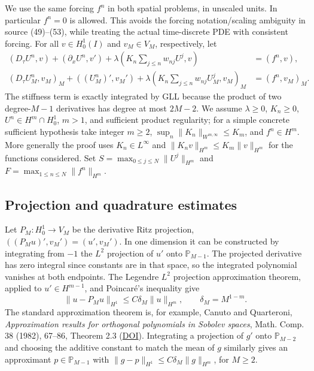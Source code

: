 \documentclass[11pt,a4paper]{amsart}
\theoremstyle{remark}
\theoremstyle{plain}
\theoremstyle{remark}
\numberwithin{equation}{section}
\begin{document}
We use the same forcing $f^n$ in both spatial problems, in unscaled units. In particular $f^n=0$ is allowed. This avoids the forcing notation/scaling ambiguity in source (49)--(53), while treating the actual time-discrete PDE with consistent forcing. For all $v\in H_0^1(I)$ and $v_M\in V_M$, respectively, let
\begin{align}
 (D_\tau U^n,v)+(\partial_x U^n,v')+\lambda(K_n\sum_{j\le n}w_{nj}U^j,v)&=(f^n,v),\label{eq:sp-cont}\\
 (D_\tau U_M^n,v_M)_M+((U_M^n)',v_M')+\lambda(K_n\sum_{j\le n}w_{nj}U_M^j,v_M)_M&=(f^n,v_M)_M.\label{eq:sp-disc}
\end{align}
The stiffness term is exactly integrated by GLL because the product of two degree-$M-1$ derivatives has degree at most $2M-2$. We assume $\lambda\ge0$, $K_n\ge0$, $U^n\in H^m\cap H_0^1$, $m>1$, and sufficient product regularity; for a simple concrete sufficient hypothesis take integer $m\ge2$, $\sup_n\|K_n\|_{W^{m,\infty}}\le K_m$, and $f^n\in H^m$. More generally the proof uses $K_n\in L^\infty$ and $\|K_n v\|_{H^m}\le K_m\|v\|_{H^m}$ for the functions considered. Set $S=\max_{0\le j\le N}\|U^j\|_{H^m}$ and $F=\max_{1\le n\le N}\|f^n\|_{H^m}$.

\subsection{Projection and quadrature estimates}
Let $P_M:H_0^1\to V_M$ be the derivative Ritz projection, $( (P_M u)',v_M')=(u',v_M')$. In one dimension it can be constructed by integrating from $-1$ the $L^2$ projection of $u'$ onto $\mathbb P_{M-1}$. The projected derivative has zero integral since constants are in that space, so the integrated polynomial vanishes at both endpoints. The Legendre $L^2$ projection approximation theorem, applied to $u'\in H^{m-1}$, and Poincar\'e's inequality give
\begin{equation}\label{eq:sp-proj}
 \|u-P_Mu\|_{H^1}\le C\delta_M\|u\|_{H^m},\qquad \delta_M=M^{1-m}.
\end{equation}
The standard approximation theorem is, for example, Canuto and Quarteroni, \emph{Approximation results for orthogonal polynomials in Sobolev spaces}, Math. Comp. 38 (1982), 67--86, Theorem 2.3 (\href{https://doi.org/10.1090/S0025-5718-1982-0637287-3}{DOI}). Integrating a projection of $g'$ onto $\mathbb P_{M-2}$ and choosing the additive constant to match the mean of $g$ similarly gives an approximant $p\in\mathbb P_{M-1}$ with $\|g-p\|_{H^1}\le C\delta_M\|g\|_{H^m}$, for $M\ge2$.
\end{document}
